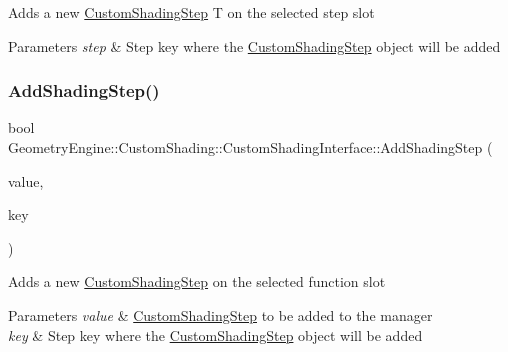 Adds a new \mbox{\hyperlink{class_geometry_engine_1_1_custom_shading_1_1_custom_shading_step}{Custom\+Shading\+Step}} T on the selected step slot 
\begin{DoxyParams}{Parameters}
{\em step} & Step key where the \mbox{\hyperlink{class_geometry_engine_1_1_custom_shading_1_1_custom_shading_step}{Custom\+Shading\+Step}} object will be added \\
\hline
\end{DoxyParams}
\mbox{\label{class_geometry_engine_1_1_custom_shading_1_1_custom_shading_interface_ae0eae78736701db330dd03ecc18ef044}} 
\subsubsection{\texorpdfstring{AddShadingStep()}{AddShadingStep()}}
{\footnotesize\ttfamily bool Geometry\+Engine\+::\+Custom\+Shading\+::\+Custom\+Shading\+Interface\+::\+Add\+Shading\+Step (\begin{DoxyParamCaption}\item[{\mbox{\hyperlink{class_geometry_engine_1_1_custom_shading_1_1_custom_shading_step}{Custom\+Shading\+Step}} $\ast$}]{value,  }\item[{\mbox{\hyperlink{namespace_geometry_engine_1_1_custom_shading_a2dc236a5b567da5099069ce2b2be5609}{Custom\+Shading\+Steps}}}]{key }\end{DoxyParamCaption})}

Adds a new \mbox{\hyperlink{class_geometry_engine_1_1_custom_shading_1_1_custom_shading_step}{Custom\+Shading\+Step}} on the selected function slot 
\begin{DoxyParams}{Parameters}
{\em value} & \mbox{\hyperlink{class_geometry_engine_1_1_custom_shading_1_1_custom_shading_step}{Custom\+Shading\+Step}} to be added to the manager \\
\hline
{\em key} & Step key where the \mbox{\hyperlink{class_geometry_engine_1_1_custom_shading_1_1_custom_shading_step}{Custom\+Shading\+Step}} object will be added \\
\hline
\end{DoxyParams}
\mbox{\label{class_geometry_engine_1_1_custom_shading_1_1_custom_shading_interface_a5fadd669b771d5782f3aed2303862bbe}} 
